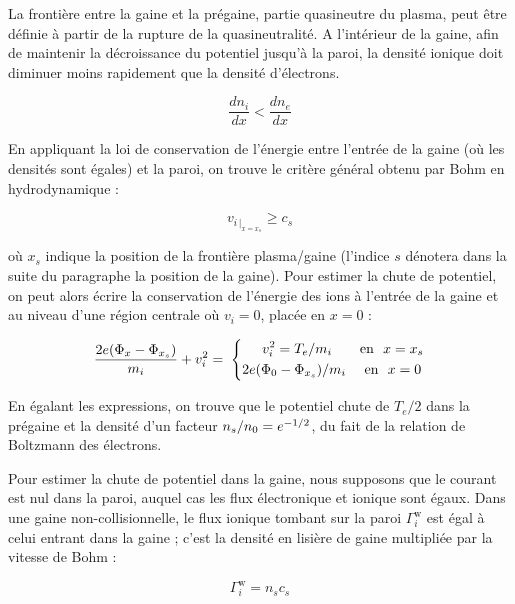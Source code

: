 \begin{refsection}
La frontière entre la gaine et la prégaine, partie quasineutre du plasma, peut
être définie à partir de la rupture de la quasineutralité. A l'intérieur de la
gaine, afin de maintenir la décroissance du potentiel jusqu'à la paroi, la
densité ionique doit diminuer moins rapidement que la densité d'électrons.
 
\begin{equation}
	\frac{dn_{i}}{dx}<\frac{dn_{e}}{dx}
\end{equation}

En appliquant la
loi de conservation de l'énergie entre l'entrée de la gaine (où les densités
sont égales) et la paroi, on trouve le critère général obtenu par Bohm en
hydrodynamique :

\begin{equation}
	v_{{i}\,|_{x=x_s}}\geq c_{s}
\end{equation}

où $x_s$ indique la position de la frontière plasma/gaine (l'indice $s$ dénotera
dans la suite du paragraphe la position de la gaine).
Pour estimer la chute de potentiel, on peut alors écrire la conservation de
l'énergie des ions à l'entrée de la gaine et au niveau d'une région centrale
où $v_{i}=0$, placée en $x=0$ :

\begin{equation}
	\frac{2e(\Phi_{x}-\Phi_{x_{s}})}{m_{i}}+v_{i}^{{2}}=\;\left\{
	\begin{aligned}
	v_i^2=T_{e}/m_{i}\text{~~~~~~en~~}{x=x_s}\\
	2e(\Phi_{0}-\Phi_{x_{s}})/m_{i}\text{~~~~en~~}{x=0\,}
	\end{aligned}\right.
\end{equation}

En égalant les expressions, on trouve que le potentiel chute de
$T_{e}/2$ dans la prégaine et la densité d'un facteur
$n_{s}/n{_{0}}=e^{-1/2}$, du fait de la relation de Boltzmann des électrons.

Pour estimer la chute de potentiel dans la gaine, nous supposons que le
courant est nul dans la paroi, auquel cas les flux électronique et ionique sont
égaux. Dans une gaine non-collisionnelle, le flux ionique
tombant sur la paroi $\Gamma_i^\text{w}$ est égal à celui entrant dans la gaine
; c'est la densité en lisière de gaine multipliée par la vitesse de Bohm :

\begin{equation}
\Gamma_i^\text{w}=n_sc_s
\end{equation}


\end{refsection}
